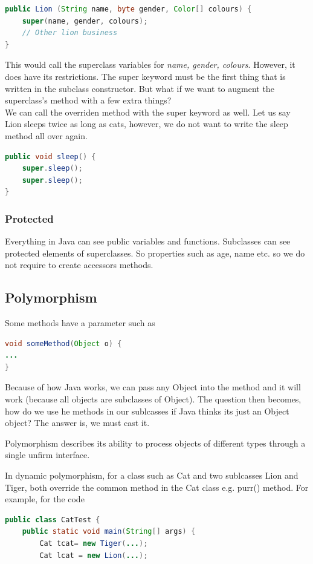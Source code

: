 \documentclass[11pt,a4 paper]{book}
\theoremstyle{plain}
\theoremstyle{definition}
\newtheorem{defn}{Definition}[section]
\theoremstyle{remark}
\begin{document}
\begin{flushleft}
\begin{lstlisting}[language = Java]
public Lion (String name, byte gender, Color[] colours) {
	super(name, gender, colours);
	// Other lion business
}
\end{lstlisting}
This would call the superclass variables for \textit{name, gender, colours}. However, it does have its restrictions. The super keyword must be the first thing that is written in the subclass constructor. But what if we want to augment the superclass's method with a few extra things? \\
We can call the overriden method with the super keyword as well. Let us say Lion sleeps twice as long as cats, however, we do not want to write the sleep method all over again.
\begin{lstlisting}[language = Java]
public void sleep() {
	super.sleep();
	super.sleep();
}
\end{lstlisting}
\subsubsection{Protected}
Everything in Java can see public variables and functions. Subclasses can see protected elements of superclasses. So properties such as age, name etc. so we do not require to create accessors methods.
\subsection{Polymorphism}
Some methods have a parameter such as
\begin{lstlisting}[language = Java]
void someMethod(Object o) {
...
}
\end{lstlisting}
Because of how Java works, we can pass any Object into the method and it will work (because all objects are subclasses of Object). The question then becomes, how do we use he methods in our sublcasses if Java thinks its just an Object object? The answer is, we must cast it. 
\begin{tcolorbox}[colback=black!3!white,colframe=black!60!white,title=\begin{defn}Polymorphism \label{Polymorphism}\end{defn}]
Polymorphism describes its ability to process objects of different types through a single unfirm interface.
\end{tcolorbox}
In dynamic polymorphism, for a class such as Cat and two sublcasses Lion and Tiger, both override the common method in the Cat class e.g. purr() method. For example, for the code
\begin{lstlisting}[language = Java]
public class CatTest {
	public static void main(String[] args) {
		Cat tcat= new Tiger(...);
		Cat lcat = new Lion(...);


\end{lstlisting}
\end{flushleft}
\end{document}

